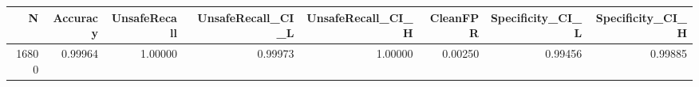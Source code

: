 \begin{tabular}{rrrrrrrr}
\toprule
N & Accuracy & UnsafeRecall & UnsafeRecall_CI_L & UnsafeRecall_CI_H & CleanFPR & Specificity_CI_L & Specificity_CI_H \\
\midrule
16800 & 0.99964 & 1.00000 & 0.99973 & 1.00000 & 0.00250 & 0.99456 & 0.99885 \\
\bottomrule
\end{tabular}
